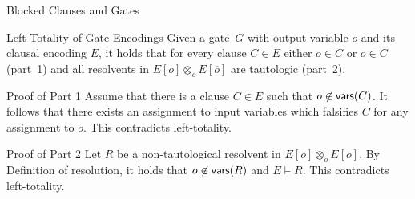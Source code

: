 \documentclass[t]{sdqbeamer}
\begin{document}
\begin{frame}{Blocked Clauses and Gates}
\begin{block}{Left-Totality of Gate Encodings}
    Given a gate~$G$ with output variable $o$ and its clausal encoding $E$, 
    it holds that for every clause $C \in E$ either $o \in C$ or $\overline o \in C$ (part~1)
    and all resolvents in $E[o] \otimes_o E[\overline o]$ are tautologic (part~2).
    \end{block}
    
    \begin{block}{Proof of Part 1}
    Assume that there is a clause $C \in E$ such that $o \not\in \textsf{vars} (C)$. 
    It follows that there exists an assignment to input variables which falsifies $C$ for any assignment to $o$. 
    This contradicts left-totality.
    \end{block}
    
    \begin{block}{Proof of Part 2}
    Let $R$ be a non-tautological resolvent in $E[o] \otimes_o E[\overline o]$. 
    By Definition of resolution, it holds that $o \not\in \textsf{vars} (R)$ and $E \models R$. 
    This contradicts left-totality. 
\end{block}
\end{frame}
    
\end{document}
